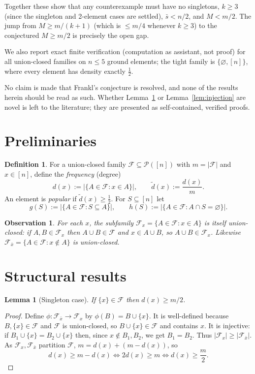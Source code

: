 \documentclass[11pt]{article}
\newtheorem{lemma}[theorem]{Lemma}
\newtheorem{observation}[theorem]{Observation}
\theoremstyle{definition}
\newtheorem{definition}[theorem]{Definition}
\theoremstyle{remark}
\newcommand{\cF}{\mathcal{F}}
\newcommand{\cP}{\mathcal{P}}
\newcommand{\emp}{\varnothing}
\newcommand{\Nhalf}{\tfrac{1}{2}}
\begin{document}
Together these show that any counterexample must have no singletons,
$k\ge3$ (since the singleton and 2-element cases are settled), $\bar s<n/2$,
and $M<m/2$. The jump from $M\ge m/(k+1)$ (which is $\le m/4$ whenever
$k\ge3$) to the conjectured $M\ge m/2$ is precisely the open gap.

We also report exact finite verification (computation as assistant, not proof)
for all union-closed families on $n\le 5$ ground elements; the tight family
is $\{\varnothing,[n]\}$, where every element has density exactly $\Nhalf$.

No claim is made that Frankl's conjecture is resolved, and none of the
results herein should be read as such. Whether Lemma~\ref{lem:singleton} or
Lemma~\ref{lem:injection} are novel is left to the literature; they are
presented as self-contained, verified proofs.

\section{Preliminaries}

\begin{definition}
For a union-closed family $\cF\subseteq\cP([n])$ with $m=|\cF|$ and
$x\in[n]$, define the \emph{frequency} (degree)
$$d(x):=|\{A\in\cF:x\in A\}|,\qquad
\widetilde d(x):=\frac{d(x)}{m}.$$
An element is \emph{popular} if $\widetilde d(x)\ge\Nhalf$.
For $S\subseteq[n]$ let
$$g(S):=|\{A\in\cF:S\subseteq A\}|,\qquad
h(S):=|\{A\in\cF:A\cap S=\emp\}|.$$
\end{definition}

\begin{observation}
For each $x$, the subfamily $\cF_x=\{A\in\cF:x\in A\}$ is itself
union-closed: if $A,B\in\cF_x$ then $A\cup B\in\cF$ and $x\in A\cup B$, so
$A\cup B\in\cF_x$. Likewise $\cF_{\bar x}=\{A\in\cF:x\notin A\}$ is
union-closed.
\end{observation}

\section{Structural results}

\begin{lemma}[Singleton case]
\label{lem:singleton}
If $\{x\}\in\cF$ then $d(x)\ge m/2$.
\end{lemma}

\begin{proof}
Define $\phi:\cF_{\bar x}\to\cF_x$ by $\phi(B)=B\cup\{x\}$.
It is well-defined because $B,\{x\}\in\cF$ and $\cF$ is union-closed, so
$B\cup\{x\}\in\cF$ and contains $x$. It is injective: if
$B_1\cup\{x\}=B_2\cup\{x\}$ then, since $x\notin B_1,B_2$, we get $B_1=B_2$.
Thus $|\cF_x|\ge|\cF_{\bar x}|$. As $\cF_x,\cF_{\bar x}$ partition $\cF$,
$m=d(x)+(m-d(x))$, so
$$d(x)\ge m-d(x)\iff 2d(x)\ge m\iff d(x)\ge\frac m2.$$
\end{proof}
\end{document}
